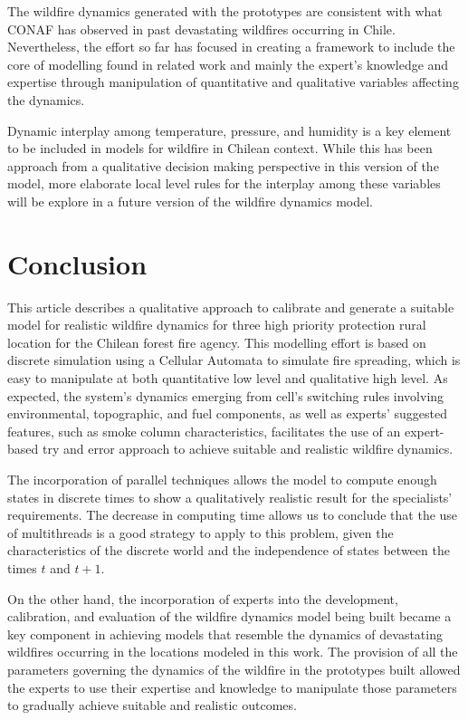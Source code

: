 \documentclass[conference]{IEEEtran}
\begin{document}
    The wildfire dynamics generated with the prototypes are consistent with what CONAF has observed in past 
    devastating wildfires occurring in Chile. Nevertheless, the effort so far has focused in creating a 
    framework to include the core of modelling found in related work and mainly the expert’s knowledge and 
    expertise through manipulation of quantitative and qualitative variables affecting the dynamics.  

    Dynamic interplay among temperature, pressure, and humidity is a key element to be included in models for 
    wildfire in Chilean context. While this has been approach from a qualitative decision making perspective 
    in this version of the model, more elaborate local level rules for the interplay among these variables will 
    be explore in a future version of the wildfire dynamics model. 

\section{Conclusion}
    
    This article describes a qualitative approach to calibrate and generate a suitable model for realistic 
    wildfire dynamics for three high priority protection rural location for the Chilean forest fire agency. 
    This modelling effort is based on discrete simulation using a Cellular Automata to simulate fire spreading, 
    which is easy to manipulate at both quantitative low level and qualitative high level. As expected, the system’s 
    dynamics emerging from cell’s switching rules involving environmental, topographic, and fuel components, as well 
    as experts’ suggested features, such as smoke column characteristics, facilitates the use of an expert-based try 
    and error approach to achieve suitable and realistic wildfire dynamics. 
    
    The incorporation of parallel techniques allows the model to compute enough states in discrete times to show 
    a qualitatively realistic result for the specialists' requirements. The decrease in computing time allows 
    us to conclude that the use of multithreads is a good strategy to apply to this problem, given the characteristics 
    of the discrete world and the independence of states between the times $t$ and $t + 1$.

    On the other hand, the incorporation of experts into the development, calibration, and evaluation of the wildfire 
    dynamics model being built became a key component in achieving models that resemble the dynamics of devastating 
    wildfires occurring in the locations modeled in this work. The provision of all the parameters governing the 
    dynamics of the wildfire in the prototypes built allowed the experts to use their expertise and knowledge to 
    manipulate those parameters to gradually achieve suitable and realistic outcomes. 
\end{document}
